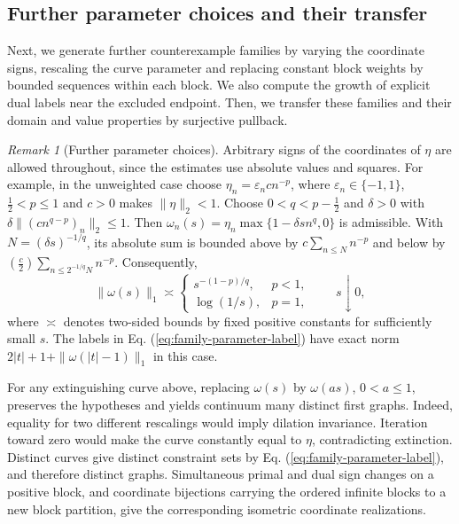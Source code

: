 \documentclass[11pt]{article}
\theoremstyle{definition}
\theoremstyle{remark}
\newtheorem{remark}{Remark}
\begin{document}
\subsection{Further parameter choices and their transfer}
\label{subsec:appendix-parameter-transfer}

Next, we generate further counterexample families by varying the coordinate signs, rescaling the curve parameter and replacing constant block weights by bounded sequences within each block. We also compute the growth of explicit dual labels near the excluded endpoint. Then, we transfer these families and their domain and value properties by surjective pullback.

\begin{remark}[Further parameter choices]
Arbitrary signs of the coordinates of $\eta$ are allowed throughout, since the estimates use absolute values and squares. For example, in the unweighted case choose $\eta_n=\varepsilon_nc n^{-p}$, where $\varepsilon_n\in\{-1,1\}$, $\frac12<p\le1$ and $c>0$ makes $\|\eta\|_2<1$. Choose $0<q<p-\frac12$ and $\delta>0$ with $\delta\|(c n^{q-p})_n\|_2\le1$. Then $\omega_n(s)=\eta_n\max\{1-\delta s n^q,0\}$ is admissible. With $N=(\delta s)^{-1/q}$, its absolute sum is bounded above by $c\sum_{n\le N}n^{-p}$ and below by $(\frac{c}{2})\sum_{n\le2^{-1/q}N}n^{-p}$. Consequently,
\[
\|\omega(s)\|_1\asymp
\begin{cases}
s^{-(1-p)/q},&p<1,\\
\log(1/s),&p=1,
\end{cases}
\qquad s\downarrow0,
\]
where $\asymp$ denotes two-sided bounds by fixed positive constants for sufficiently small $s$. The labels in Eq. (\ref{eq:family-parameter-label}) have exact norm $2|t|+1+\|\omega(|t|-1)\|_1$ in this case.

For any extinguishing curve above, replacing $\omega(s)$ by $\omega(as)$, $0<a\le1$, preserves the hypotheses and yields continuum many distinct first graphs. Indeed, equality for two different rescalings would imply dilation invariance. Iteration toward zero would make the curve constantly equal to $\eta$, contradicting extinction. Distinct curves give distinct constraint sets by Eq. (\ref{eq:family-parameter-label}), and therefore distinct graphs. Simultaneous primal and dual sign changes on a positive block, and coordinate bijections carrying the ordered infinite blocks to a new block partition, give the corresponding isometric coordinate realizations.


\end{remark}
\end{document}
